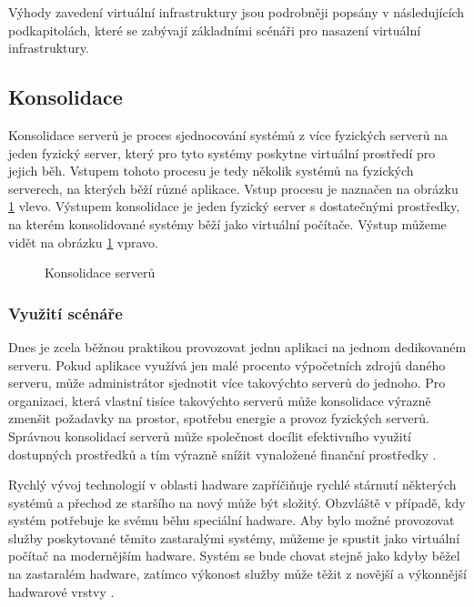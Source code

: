 Výhody zavedení virtuální infrastruktury jsou podrobněji popsány v následujících podkapitolách, které se zabývají základními scénáři pro nasazení virtuální infrastruktury.

\subsection{Konsolidace}
\label{consolidation}

Konsolidace serverů je proces sjednocování systémů z více fyzických serverů na jeden fyzický server, který pro tyto systémy poskytne virtuální prostředí pro jejich běh. Vstupem tohoto procesu je tedy několik systémů na fyzických serverech,
na kterých běží různé aplikace. Vstup procesu je naznačen na obrázku \ref{consolidation_img} vlevo. Výstupem konsolidace je jeden fyzický server s dostatečnými prostředky, na kterém konsolidované systémy běží jako virtuální počítače.
Výstup můžeme vidět na obrázku \ref{consolidation_img} vpravo.

\begin{figure}
    \centering    
    \caption{Konsolidace serverů}
    \label{consolidation_img}
\end{figure}

\subsubsection*{Využití scénáře}

Dnes je zcela běžnou praktikou provozovat jednu aplikaci na jednom dedikovaném serveru. Pokud aplikace využívá jen malé procento výpočetních zdrojů daného serveru, může administrátor sjednotit více takovýchto serverů
do jednoho. Pro organizaci, která vlastní tisíce takovýchto serverů může konsolidace výrazně zmenšit požadavky na prostor, spotřebu energie a provoz fyzických serverů. Správnou konsolidací serverů může společnost docílit
efektivního využití dostupných prostředků a tím výrazně snížit vynaložené finanční prostředky \cite{reasons}.

Rychlý vývoj technologií v oblasti hadware zapříčiňuje rychlé stárnutí některých systémů a přechod ze staršího na nový může být složitý. Obzvláště v případě, kdy systém potřebuje ke svému běhu speciální hadware.
Aby bylo možné provozovat služby poskytované těmito zastaralými systémy, můžeme je spustit jako virtuální počítač na modernějším hadware. Systém se bude chovat stejně jako kdyby běžel na zastaralém hadware, zatímco
výkonost služby může těžit z novější a výkonnější hadwarové vrstvy  \cite{reasons}.

